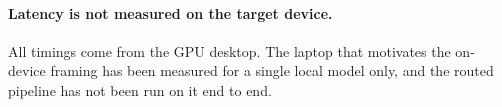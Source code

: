 \documentclass{article}
\begin{document}
\paragraph{Latency is not measured on the target device.}
All timings come from the GPU desktop. The laptop that motivates the on-device framing has
been measured for a single local model only, and the routed pipeline has not been run on
it end to end.




% 
\end{document}
